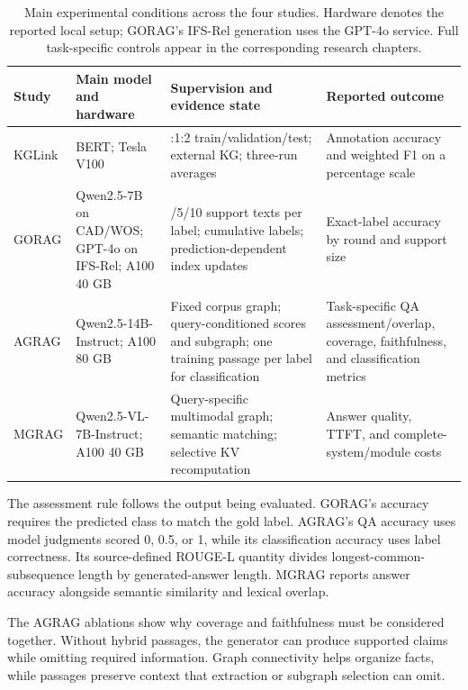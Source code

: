 \begin{table}[tbp]
\centering\small
\caption{Main experimental conditions across the four studies. Hardware denotes the reported local setup; GORAG's IFS-Rel generation uses the GPT-4o service. Full task-specific controls appear in the corresponding research chapters.}
\label{tab:discussion:controls}
\begin{tabular}{>{\raggedright\arraybackslash}p{}>{\raggedright\arraybackslash}p{}>{\raggedright\arraybackslash}p{}>{\raggedright\arraybackslash}p{}}
\toprule
Study & Main model and hardware & Supervision and evidence state & Reported outcome\\
\midrule
KGLink & BERT; Tesla V100 & 7:1:2 train/validation/test; external KG; three-run averages & Annotation accuracy and weighted F1 on a percentage scale\\
GORAG & Qwen2.5-7B on CAD/WOS; GPT-4o on IFS-Rel; A100 40 GB & 1/5/10 support texts per label; cumulative labels; prediction-dependent index updates & Exact-label accuracy by round and support size\\
AGRAG & Qwen2.5-14B-Instruct; A100 80 GB & Fixed corpus graph; query-conditioned scores and subgraph; one training passage per label for classification & Task-specific QA assessment/overlap, coverage, faithfulness, and classification metrics\\
MGRAG & Qwen2.5-VL-7B-Instruct; A100 40 GB & Query-specific multimodal graph; semantic matching; selective KV recomputation & Answer quality, TTFT, and complete-system/module costs\\
\bottomrule
\end{tabular}
\end{table}

\begin{samepage}
The assessment rule follows the output being evaluated. GORAG's accuracy requires the predicted class to match the gold label. AGRAG's QA accuracy uses model judgments scored 0, 0.5, or 1, while its classification accuracy uses label correctness. Its source-defined ROUGE-L quantity divides longest-common-subsequence length by generated-answer length. MGRAG reports answer accuracy alongside semantic similarity and lexical overlap.\par
\end{samepage}

The AGRAG ablations show why coverage and faithfulness must be considered together. Without hybrid passages, the generator can produce supported claims while omitting required information. Graph connectivity helps organize facts, while passages preserve context that extraction or subgraph selection can omit.

